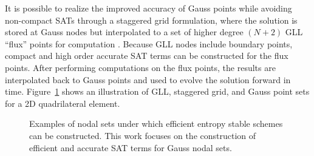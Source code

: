 \documentclass[review,onefignum,onetabnum,final]{siamart171218}
\begin{document}
It is possible to realize the improved accuracy of Gauss points while avoiding non-compact SATs through a staggered grid formulation, where the solution is stored at Gauss nodes but interpolated to a set of higher degree $(N+2)$ GLL ``flux'' points for computation \cite{parsani2016entropy}.  Because GLL nodes include boundary points, compact and high order accurate SAT terms can be constructed for the flux points.  After performing computations on the flux points, the results are interpolated back to Gauss points and used to evolve the solution forward in time.  Figure~\ref{fig:nodesets} shows an illustration of GLL, staggered grid, and Gauss point sets for a 2D quadrilateral element.  

\begin{figure}
\centering
{}
\hspace{.5em}
\hspace{.5em}
\caption{Examples of nodal sets under which efficient entropy stable schemes can be constructed.  This work focuses on the construction of efficient and accurate SAT terms for Gauss nodal sets.}
\label{fig:nodesets}
\end{figure}
\end{document}
